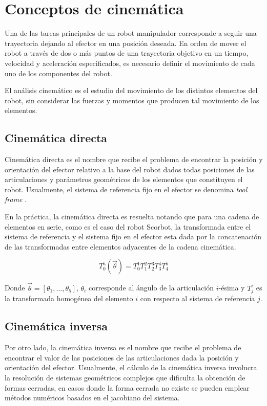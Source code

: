 



\section{Conceptos de cinemática}

Una de las tareas principales de un robot manipulador corresponde a seguir una trayectoria dejando al efector en una posición deseada. En orden de mover el robot a través de dos o más puntos de una trayectoria objetivo en un tiempo, velocidad y aceleración especificados, es necesario definir el movimiento de cada uno de los componentes del robot.

El análisis cinemático es el estudio del movimiento de los distintos elementos del robot, sin considerar las fuerzas y momentos que producen tal movimiento de los elementos.

\subsection{Cinemática directa}

Cinemática directa es el nombre que recibe el problema de encontrar la posición y orientación del efector relativo a la base del robot dados todas posiciones de las articulaciones y parámetros geométricos de los elementos que constituyen el robot. Usualmente, el sistema de referencia fijo en el efector se denomina \textit{tool frame} \cite{handbook}.

En la práctica, la cinemática directa es resuelta notando que para una cadena de elementos en serie, como es el caso del robot Scorbot, la transformada entre el sistema de referencia y el sistema fijo en el efector esta dada por la concatenación de las transformadas entre elementos adyacentes de la cadena cinemática.

\begin{equation}
T_0^5(\vec{\theta}) = T_0^1 T_1^2 T_2^3 T_3^4 T_4^5 
\end{equation}

Donde $\vec{\theta}=[\theta_1,\dotsc,\theta_5]$, $\theta_i$ corresponde al ángulo de la articulación $i$-ésima y $T_j^i$ es la transformada homogénea del elemento $i$ con respecto al sistema de referencia $j$.

\subsection{Cinemática inversa}

Por otro lado, la cinemática inversa es el nombre que recibe el problema de encontrar el valor de las posiciones de las articulaciones dada la posición y orientación del efector.
Usualmente, el cálculo de la cinemática inversa involucra la resolución de sistemas geométricos complejos que dificulta la obtención de formas cerradas, en casos donde la forma cerrada no existe se pueden emplear métodos numéricos basados en el jacobiano del sistema.

